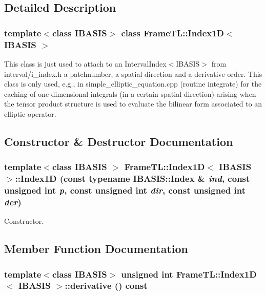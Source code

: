 \subsection{Detailed Description}
\subsubsection*{template$<$class IBASIS$>$ class FrameTL::Index1D$<$ IBASIS $>$}

This class is just used to attach to an IntervalIndex$<$IBASIS$>$ from interval/i\_\-index.h a patchnumber, a spatial direction and a derivative order. This class is only used, e.g., in simple\_\-elliptic\_\-equation.cpp (routine integrate) for the caching of one dimensional integrals (in a certain spatial direction) arising when the tensor product structure is used to evaluate the bilinear form associated to an elliptic operator. 

\subsection{Constructor \& Destructor Documentation}
\hypertarget{classFrameTL_1_1Index1D_009f4a2f3382426f8c0560c7e764e7a8}{
\subsubsection[{Index1D}]{\setlength{\rightskip}{0pt plus 5cm}template$<$class IBASIS $>$ {\bf FrameTL::Index1D}$<$ IBASIS $>$::{\bf Index1D} (const typename IBASIS::Index \& {\em ind}, \/  const unsigned int {\em p}, \/  const unsigned int {\em dir}, \/  const unsigned int {\em der})}}
\label{classFrameTL_1_1Index1D_009f4a2f3382426f8c0560c7e764e7a8}


Constructor. 

\subsection{Member Function Documentation}
\hypertarget{classFrameTL_1_1Index1D_46d0d42aec593b2e95c9b5c9d52c8996}{
\subsubsection[{derivative}]{\setlength{\rightskip}{0pt plus 5cm}template$<$class IBASIS$>$ unsigned int {\bf FrameTL::Index1D}$<$ IBASIS $>$::derivative () const}}
\label{classFrameTL_1_1Index1D_46d0d42aec593b2e95c9b5c9d52c8996}


